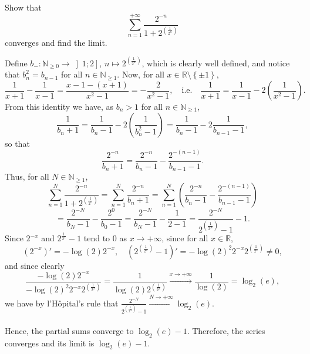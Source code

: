 \begin{problem}
    Show that
    \[
        \sum_{n=1}^{+\infty} \frac{2^{-n}}{1+2^{\left(\frac{1}{2^n}\right)}}
    \]
    converges and find the limit.
\end{problem}
\begin{solution}
    Define \( b_{-} \colon \mathbb{N}_{\geq 0} \to \left]1;2\right] \), \( n \mapsto 2^{\left(\frac{1}{2^n}\right)} \), which is clearly well defined, and notice that \( b_n^2 = b_{n-1} \) for all \( n \in \mathbb{N}_{\geq 1} \). Now, for all \( x \in \mathbb{R} \setminus \left\{\pm 1\right\} \),
    \[
        \frac{1}{x+1} - \frac{1}{x-1} = \frac{x-1-\left(x+1\right)}{x^2-1} = -\frac{2}{x^2-1}, \quad \text{i.e.} \quad \frac{1}{x+1} = \frac{1}{x-1} - 2\left(\frac{1}{x^2-1}\right).
    \]
    From this identity we have, as \( b_n > 1 \) for all \( n \in \mathbb{N}_{\geq 1} \),
    \[
        \frac{1}{b_n+1} = \frac{1}{b_n-1} - 2\left(\frac{1}{b_n^2-1}\right) = \frac{1}{b_n-1} - 2\frac{1}{b_{n-1}-1},
    \]
    so that
    \[
        \frac{2^{-n}}{b_n+1} = \frac{2^{-n}}{b_n-1} - \frac{2^{-\left(n-1\right)}}{b_{n-1}-1}.
    \]
    Thus, for all \( N \in \mathbb{N}_{\geq 1} \),
    \[
        \sum_{n=1}^{N} \frac{2^{-n}}{1+2^{\left(\frac{1}{2^n}\right)}} = \sum_{n=1}^{N} \frac{2^{-n}}{b_n+1} = \sum_{n=1}^{N} \left(\frac{2^{-n}}{b_n-1} - \frac{2^{-\left(n-1\right)}}{b_{n-1}-1}\right)
    \]
    \[
        = \frac{2^{-N}}{b_N-1} - \frac{2^0}{b_0-1} = \frac{2^{-N}}{b_N-1} - \frac{1}{2-1} = \frac{2^{-N}}{2^{\left(\frac{1}{2^N}\right)}-1} - 1.
    \]
    Since \( 2^{-x} \) and \( 2^{\frac{1}{2^x}}-1 \) tend to \( 0 \) as \( x \to +\infty \), since for all \( x \in \mathbb{R} \),
    \[
        \left(2^{-x}\right)' = -\log\left(2\right)2^{-x}, \quad \left(2^{\left(\frac{1}{2^x}\right)}-1\right)' = -\log\left(2\right)^2 2^{-x} 2^{\left(\frac{1}{2^x}\right)} \neq 0,
    \]
    and since clearly
    \[
        \frac{-\log\left(2\right)2^{-x}}{-\log\left(2\right)^2 2^{-x} 2^{\left(\frac{1}{2^x}\right)}} = \frac{1}{\log\left(2\right) 2^{\left(\frac{1}{2^x}\right)}} \overset{x \to +\infty}{\longrightarrow} \frac{1}{\log\left(2\right)} = \log_2\left(e\right),
    \]
    we have by l'H\^opital's rule that \( \frac{2^{-N}}{2^{\left(\frac{1}{2^N}\right)}-1} \overset{N \to +\infty}{\longrightarrow} \log_2\left(e\right) \).
    \\\\
    Hence, the partial sums converge to \( \log_2\left(e\right) - 1 \). Therefore, the series converges and its limit is \( \log_2\left(e\right) - 1 \).
\end{solution}
